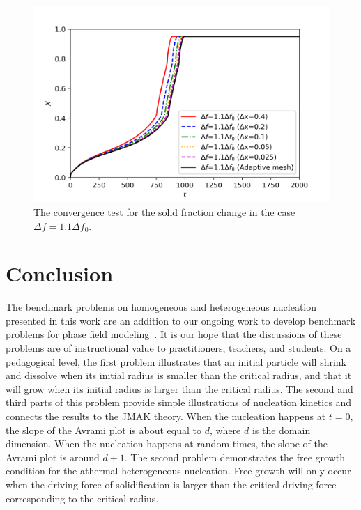 \documentclass[preprint,12pt]{elsarticle}
\begin{document}
\begin{center}
\begin{figure} 
\begin{centering}
\includegraphics[scale=1.0]{convergence_athermal.PNG}
\par\end{centering}
\caption{The convergence test for the solid fraction change in the case $\Delta f=1.1\Delta f_0$.}\label{fig:convergence_athermal}
\end{figure}
\par\end{center}
%

\section{Conclusion}

The benchmark problems on homogeneous and heterogeneous nucleation presented in this work are an addition to our ongoing work to develop benchmark problems for phase field modeling~\cite{jokisaari2017spinodal,jokisaari2017dendrite,jokisaari2020stokes}. %
It is our hope that the discussions of these problems are of instructional value to practitioners, teachers, and students. %
On a pedagogical level, the first problem illustrates that an initial particle will shrink and dissolve when its initial radius is smaller than the critical radius, and that it will grow when its initial radius is larger than the critical radius. The second and third parts of this problem provide simple illustrations of nucleation kinetics and connects the results to the JMAK theory. When the nucleation happens at $t=0$, the slope of the Avrami plot is about equal to $d$, where $d$ is the domain dimension. When the nucleation happens at random times, the slope of the Avrami plot is around $d+1$. The second problem demonstrates the free growth condition for the athermal heterogeneous nucleation. Free growth will only occur when the driving force of solidification is larger than the critical driving force corresponding to the critical radius. 
\end{document}
